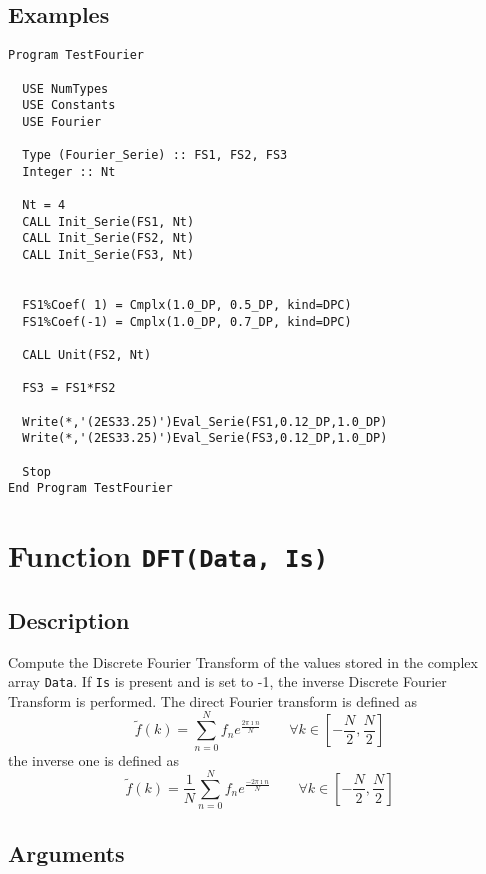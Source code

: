 \subsection{Examples}

\begin{verbatim}
Program TestFourier

  USE NumTypes
  USE Constants
  USE Fourier

  Type (Fourier_Serie) :: FS1, FS2, FS3
  Integer :: Nt

  Nt = 4
  CALL Init_Serie(FS1, Nt)
  CALL Init_Serie(FS2, Nt)
  CALL Init_Serie(FS3, Nt)


  FS1%Coef( 1) = Cmplx(1.0_DP, 0.5_DP, kind=DPC)
  FS1%Coef(-1) = Cmplx(1.0_DP, 0.7_DP, kind=DPC)

  CALL Unit(FS2, Nt)

  FS3 = FS1*FS2

  Write(*,'(2ES33.25)')Eval_Serie(FS1,0.12_DP,1.0_DP)
  Write(*,'(2ES33.25)')Eval_Serie(FS3,0.12_DP,1.0_DP)

  Stop
End Program TestFourier
\end{verbatim}


\section{Function \texttt{DFT(Data, Is)}}

\subsection{Description}

Compute the Discrete Fourier Transform of the values stored in the
complex array \texttt{Data}. If \texttt{Is} is present and 
is set to -1, the inverse Discrete Fourier Transform is performed. The
direct Fourier transform is defined as
\begin{displaymath}
  \tilde f(k) = \sum_{n=0}^N f_ne^{\frac{2\pi\imath n}{N}}\qquad\forall k
  \in \left[-\frac{N}{2}, \frac{N}{2}\right]
\end{displaymath}
the inverse one is defined as
\begin{displaymath}
  \tilde f(k) = \frac{1}{N}\sum_{n=0}^N f_ne^{\frac{-2\pi\imath
      n}{N}}\qquad\forall k 
  \in \left[-\frac{N}{2}, \frac{N}{2}\right]
\end{displaymath}

\subsection{Arguments}

